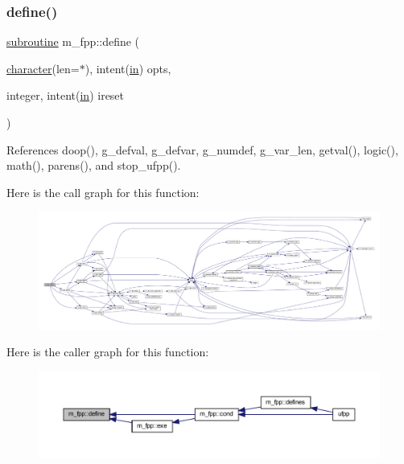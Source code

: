 \subsubsection{\texorpdfstring{define()}{define()}}
{\footnotesize\ttfamily \hyperlink{M__stopwatch_83_8txt_acfbcff50169d691ff02d4a123ed70482}{subroutine} m\+\_\+fpp\+::define (\begin{DoxyParamCaption}\item[{\hyperlink{option__stopwatch_83_8txt_abd4b21fbbd175834027b5224bfe97e66}{character}(len=$\ast$), intent(\hyperlink{M__journal_83_8txt_afce72651d1eed785a2132bee863b2f38}{in})}]{opts,  }\item[{integer, intent(\hyperlink{M__journal_83_8txt_afce72651d1eed785a2132bee863b2f38}{in})}]{ireset }\end{DoxyParamCaption})}



References doop(), g\+\_\+defval, g\+\_\+defvar, g\+\_\+numdef, g\+\_\+var\+\_\+len, getval(), logic(), math(), parens(), and stop\+\_\+ufpp().

Here is the call graph for this function\+:
\nopagebreak
\begin{figure}[H]
\begin{center}
\leavevmode
\includegraphics[width=350pt]{namespacem__fpp_a43f195db2d7dcdbaf89cb2e45ca60421_cgraph}
\end{center}
\end{figure}
Here is the caller graph for this function\+:
\nopagebreak
\begin{figure}[H]
\begin{center}
\leavevmode
\includegraphics[width=350pt]{namespacem__fpp_a43f195db2d7dcdbaf89cb2e45ca60421_icgraph}
\end{center}
\end{figure}
\mbox{\label{namespacem__fpp_a1db94413ac57479277fa9a5528ea3c26}} 
